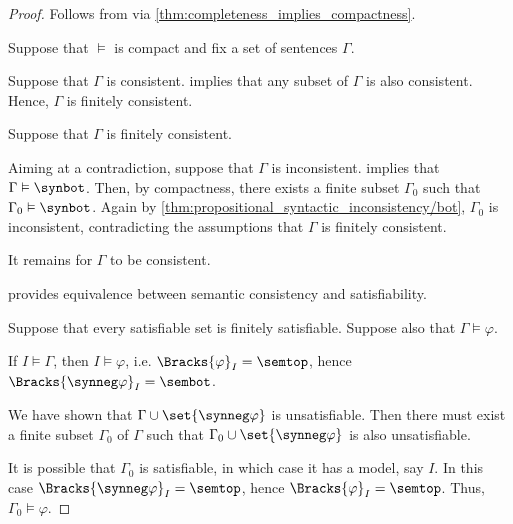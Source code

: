 \begin{proof}
   Follows from  via \cref{thm:completeness_implies_compactness}.

   Suppose that \( {\vDash} \) is compact and fix a set of sentences \( \Gamma \).

  \SufficiencySubProof* Suppose that \( \Gamma \) is consistent.  implies that any subset of \( \Gamma \) is also consistent. Hence, \( \Gamma \) is finitely consistent.

  \NecessitySubProof* Suppose that \( \Gamma \) is finitely consistent.

  Aiming at a contradiction, suppose that \( \Gamma \) is inconsistent.  implies that \( \Gamma \vDash \synbot \). Then, by compactness, there exists a finite subset \( \Gamma_0 \) such that \( \Gamma_0 \vDash \synbot \). Again by \cref{thm:propositional_syntactic_inconsistency/bot}, \( \Gamma_0 \) is inconsistent, contradicting the assumptions that \( \Gamma \) is finitely consistent.

  It remains for \( \Gamma \) to be consistent.

    provides equivalence between semantic consistency and satisfiability.

   Suppose that every satisfiable set is finitely satisfiable. Suppose also that \( \Gamma \vDash \varphi \).

  If \( I \vDash \Gamma \), then \( I \vDash \varphi \), i.e. \( \Bracks{\varphi}_I = \semtop \), hence \( \Bracks{\synneg \varphi}_I = \sembot \).

  We have shown that \( \Gamma \cup \set{ \synneg \varphi } \) is unsatisfiable. Then there must exist a finite subset \( \Gamma_0 \) of \( \Gamma \) such that \( \Gamma_0 \cup \set{ \synneg \varphi } \) is also unsatisfiable.

  It is possible that \( \Gamma_0 \) is satisfiable, in which case it has a model, say \( I \). In this case \( \Bracks{\synneg \varphi}_I = \semtop \), hence \( \Bracks{\varphi}_I = \semtop \). Thus, \( \Gamma_0 \vDash \varphi \).
\end{proof}
